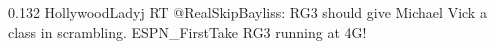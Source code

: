 %
%
%
%
{0.132}
{\joinNameTweet
{HollywoodLadyj}
{RT @RealSkipBayliss: RG3 should give Michael Vick a class in scrambling.}}
{\joinNameTweet
{ESPN\_FirstTake}
{RG3 running at 4G!}}
%
%
%
%
%
%
